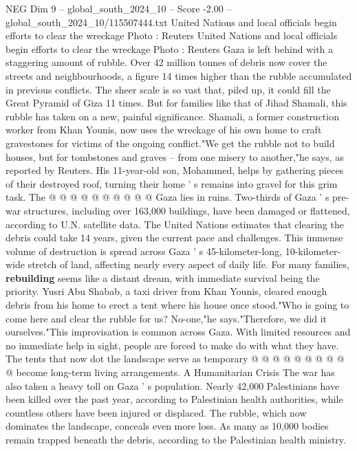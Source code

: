 \begin{textsample}{NEG Dim 9 – global\_south\_2024\_10 – Score -2.00 – global\_south\_2024\_10/115507444.txt}  \label{ex:f9_neg_367}
United Nations and local officials begin efforts to clear the wreckage Photo : Reuters United Nations and local officials begin efforts to clear the wreckage Photo : Reuters Gaza is left behind with a staggering amount of rubble.
Over 42 million tonnes of debris now cover the streets and neighbourhoods, a figure 14 times higher than the rubble accumulated in previous conflicts.
The sheer scale is so vast that, piled up, it could fill the Great Pyramid of Giza 11 times.
But for families like that of Jihad Shamali, this rubble has taken on a new, painful significance.
Shamali, a former construction worker from Khan Younis, now uses the wreckage of his own home to craft gravestones for victims of the ongoing conflict."We get the rubble not to build houses, but for tombstones and graves -- from one misery to another,"he says, as reported by Reuters.
His 11-year-old son, Mohammed, helps by gathering pieces of their destroyed roof, turning their home ' s remains into gravel for this grim task.
The @ @ @ @ @ @ @ @ @ @ Gaza lies in ruins.
Two-thirds of Gaza ' s pre-war structures, including over 163,000 buildings, have been damaged or flattened, according to U.N. satellite data.
The United Nations estimates that clearing the debris could take 14 years, given the current pace and challenges.
This immense volume of destruction is spread across Gaza ' s 45-kilometer-long, 10-kilometer-wide stretch of land, affecting nearly every aspect of daily life.
For many families, \textbf{rebuilding} seems like a distant dream, with immediate survival being the priority.
Yusri Abu Shabab, a taxi driver from Khan Younis, cleared enough debris from his home to erect a tent where his house once stood."Who is going to come here and clear the rubble for us?
No-one,"he says."Therefore, we did it ourselves."This improvisation is common across Gaza.
With limited resources and no immediate help in sight, people are forced to make do with what they have.
The tents that now dot the landscape serve as temporary @ @ @ @ @ @ @ @ @ @ become long-term living arrangements.
A Humanitarian Crisis The war has also taken a heavy toll on Gaza ' s population.
Nearly 42,000 Palestinians have been killed over the past year, according to Palestinian health authorities, while countless others have been injured or displaced.
The rubble, which now dominates the landscape, conceals even more loss.
As many as 10,000 bodies remain trapped beneath the debris, according to the Palestinian health ministry.

\end{textsample}
